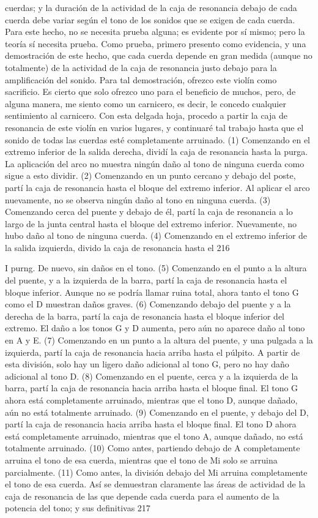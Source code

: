 cuerdas; y la duración de la actividad de la caja de resonancia debajo de cada cuerda debe variar según el tono de los sonidos que se exigen de cada cuerda.
Para este hecho, no se necesita prueba alguna; es evidente por sí mismo; pero la teoría sí necesita prueba. Como prueba, primero presento como evidencia, y una demostración de este hecho, que cada cuerda depende en gran medida (aunque no totalmente) de la actividad de la caja de resonancia justo debajo para la amplificación del sonido. Para tal demostración, ofrezco este violín como sacrificio. Es cierto que solo ofrezco uno para el beneficio de muchos, pero, de alguna manera, me siento como un carnicero, es decir, le concedo cualquier sentimiento al carnicero. Con esta delgada hoja, procedo a partir la caja de resonancia de este violín en varios lugares, y continuaré tal trabajo hasta que el sonido de todas las cuerdas esté completamente arruinado.
(1) Comenzando en el extremo inferior de la salida derecha, dividí la caja de resonancia hasta la purga. La aplicación del arco no muestra ningún daño al tono de ninguna cuerda como sigue a esto
dividir.
(2) Comenzando en un punto cercano y debajo del poste, partí la caja de resonancia hasta el bloque del extremo inferior. Al aplicar el arco nuevamente, no se observa ningún daño al tono en ninguna cuerda.
(3) Comenzando cerca del puente y debajo de él, partí la caja de resonancia a lo largo de la junta central hasta el bloque del extremo inferior. Nuevamente, no hubo daño al tono de ninguna cuerda.
(4) Comenzando en el extremo inferior de la salida izquierda, divido la caja de resonancia hasta el
216

I
purng. De nuevo, sin daños en el tono.
(5) Comenzando en el punto a la altura del puente, y a la izquierda de la barra, partí la caja de resonancia hasta el bloque inferior. Aunque no se podría llamar ruina total, ahora tanto el tono G como el D muestran daños graves.
(6) Comenzando debajo del puente y a la derecha de la barra, partí la caja de resonancia hasta el bloque inferior del extremo. El daño a los tonos G y D aumenta, pero aún no aparece daño al tono en A y E.
(7) Comenzando en un punto a la altura del puente, y una pulgada a la izquierda, partí la caja de resonancia hacia arriba hasta el púlpito. A partir de esta división, solo hay un ligero daño adicional al tono G, pero no hay daño adicional al tono D.
(8) Comenzando en el puente, cerca y a la izquierda de la barra, partí la caja de resonancia hacia arriba hasta el bloque final. El tono G ahora está completamente arruinado, mientras que el tono D, aunque dañado, aún no está totalmente arruinado.
(9) Comenzando en el puente, y debajo del D, partí la caja de resonancia hacia arriba hasta el bloque final. El tono D ahora está completamente arruinado, mientras que el tono A, aunque dañado, no está totalmente arruinado. (10) Como antes, partiendo debajo de A completamente
arruina el tono de esa cuerda, mientras que el tono de Mi solo se arruina parcialmente. (11) Como antes, la división debajo del Mi arruina completamente el tono de esa cuerda. Así se demuestran claramente las áreas de actividad de la caja de resonancia de las que depende cada cuerda para el aumento de la potencia del tono; y sus definitivas
217

